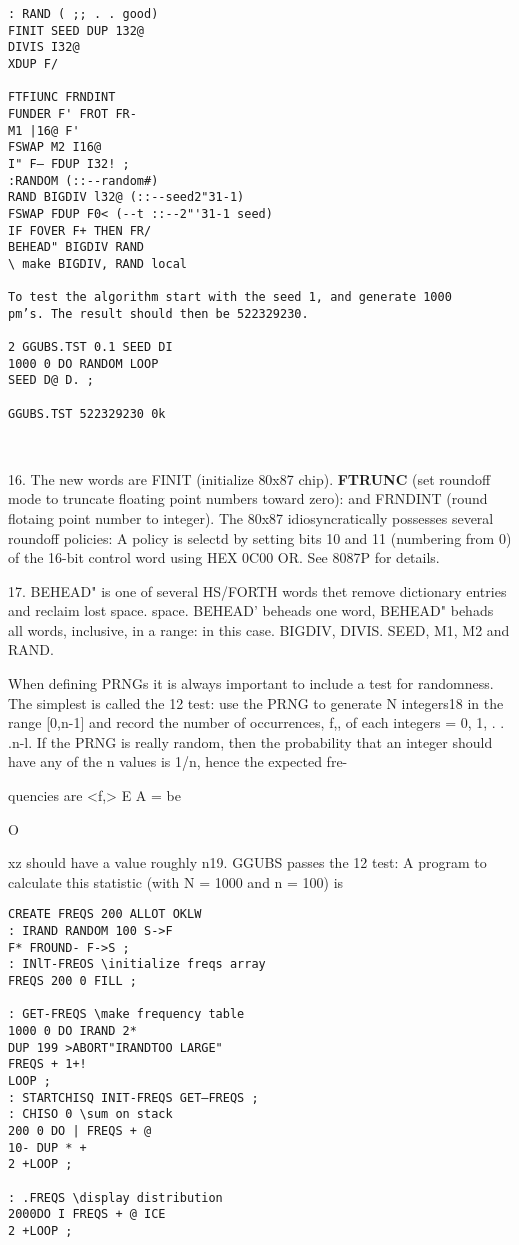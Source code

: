 \begin{verbatim}
: RAND ( ;; . . good)
FINIT SEED DUP 132@
DIVIS I32@
XDUP F/

FTFIUNC FRNDINT
FUNDER F' FROT FR-
M1 |16@ F'
FSWAP M2 I16@
I" F— FDUP I32! ;
:RANDOM (::--random#)
RAND BIGDIV l32@ (::--seed2"31-1)
FSWAP FDUP F0< (--t ::--2"'31-1 seed)
IF FOVER F+ THEN FR/
BEHEAD" BIGDIV RAND
\ make BIGDIV, RAND local

To test the algorithm start with the seed 1, and generate 1000
pm’s. The result should then be 522329230.

2 GGUBS.TST 0.1 SEED DI
1000 0 DO RANDOM LOOP
SEED D@ D. ;

GGUBS.TST 522329230 0k

 
\end{verbatim}

16. The new words are FINIT (initialize 80x87 chip). \textbf{FTRUNC} (set
roundoff mode to truncate ﬂoating point numbers toward zero): and FRNDINT
(round flotaing point number to integer). The
80x87 idiosyncratically possesses several roundoff policies: A policy is selectd by setting bits 10
and 11 (numbering from 0) of the 16-bit control word using HEX 0C00 OR. See 8087P for
details.

17. BEHEAD" is one of several HS/FORTH words thet remove dictionary entries and reclaim lost space.
space. BEHEAD' beheads one word, BEHEAD" behads all words, inclusive, in a range: in this
case. BIGDIV, DIVIS. SEED, M1, M2 and RAND.



When defining PRNGs it is always important to include a test
for randomness. The simplest is called the 12 test: use the
PRNG to generate N integers18 in the range [0,n-1] and record
the number of occurrences, f,, of each integers = 0, 1, . . .n-l. If
the PRNG is really random, then the probability that an integer
should have any of the n values is 1/n, hence the expected fre-

quencies are <f,> E A = %
be


O

xz should have a value roughly n19. GGUBS passes the 12 test: A
program to calculate this statistic (with N = 1000 and n = 100) is

\begin{verbatim}
CREATE FREQS 200 ALLOT OKLW
: IRAND RANDOM 100 S->F
F* FROUND- F->S ;
: INlT-FREOS \initialize freqs array
FREQS 200 0 FILL ;

: GET-FREQS \make frequency table
1000 0 DO IRAND 2*
DUP 199 >ABORT"IRANDTOO LARGE"
FREQS + 1+!
LOOP ;
: STARTCHISQ INIT-FREQS GET—FREQS ;
: CHISO 0 \sum on stack
200 0 DO | FREQS + @
10- DUP * +
2 +LOOP ;

: .FREQS \display distribution
2000DO I FREQS + @ ICE
2 +LOOP ;

\end{verbatim}
 


